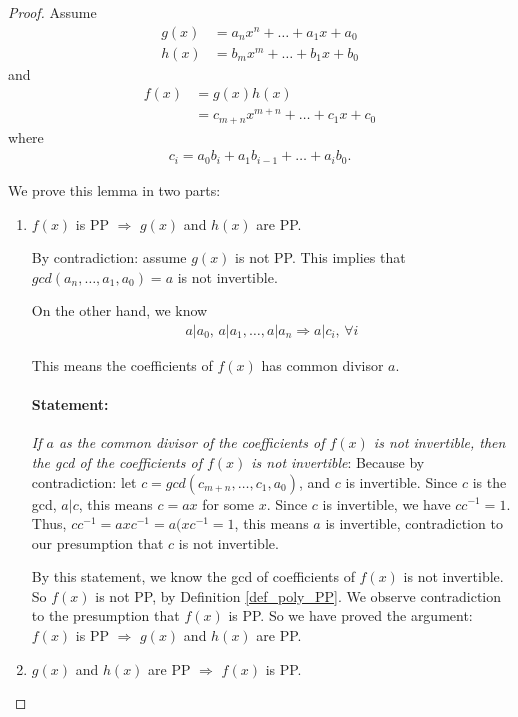 \documentclass[utf8]{ctexbook}
\begin{document}
\begin{proof}
Assume
\begin{align*}
g(x) &= a_n x^n + \ldots + a_1 x + a_0 \\
h(x) &= b_m x^m + \ldots + b_1 x + b_0
\end{align*}
and
\begin{align*}
f(x) &= g(x) h(x) \\
&= c_{m+n} x^{m+n} + \ldots + c_1 x + c_0
\end{align*}
where
\begin{align*}
c_i = a_0 b_i + a_1 b_{i-1} + \ldots + a_i b_0 .
\end{align*}

We prove this lemma in two parts:
\begin{enumerate}
\item{$f(x)$ is PP $\Longrightarrow$ $g(x)$ and $h(x)$ are PP. 

By contradiction: assume $g(x)$ is not PP. This implies that $gcd(a_n, \ldots, a_1, a_0) = a$ is not invertible.

On the other hand, we know
\begin{align*}
a | a_0, \, a| a_1, \ldots, a | a_n \Longrightarrow a | c_i, \, \forall i
\end{align*}

This means the coefficients of $f(x)$ has common divisor $a$. 

\paragraph{Statement:} \emph{If $a$ as the common divisor of the coefficients of $f(x)$ is not invertible, then the gcd of the coefficients of $f(x)$ is not invertible}: Because by contradiction: let $c = gcd(c_{m+n}, \ldots, c_1, a_0)$, and $c$ is invertible. Since $c$ is the gcd, $a | c$, this means $c = a x $ for some $x$. Since $c$ is invertible, we have $c c^{-1} = 1$. Thus, $c c^{-1} = a x c^{-1} = a ( x c^{-1} = 1$, this means $a$ is invertible, contradiction to our presumption that $c$ is not invertible.

By this statement, we know the gcd of coefficients of $f(x)$ is not invertible. So $f(x)$ is not PP, by Definition \ref{def_poly_PP}. We observe contradiction to the presumption that $f(x)$ is PP. So we have proved the argument: $f(x)$ is PP $\Longrightarrow$ $g(x)$ and $h(x)$ are PP.

}
\item{$g(x)$ and $h(x)$ are PP $\Longrightarrow$ $f(x)$ is PP.

}
\end{enumerate}
\end{proof}
\end{document}
